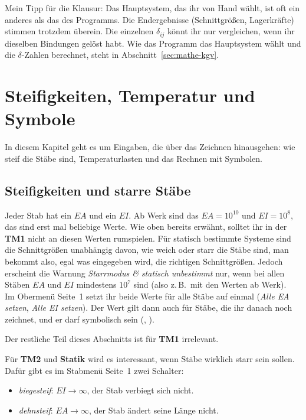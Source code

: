 Mein Tipp für die Klausur: Das Hauptsystem, das ihr von Hand wählt, ist oft ein anderes als das
des Programms. Die Endergebnisse (Schnittgrößen, Lagerkräfte) stimmen trotzdem überein. Die
einzelnen $\delta_{ij}$ könnt ihr nur vergleichen, wenn ihr dieselben Bindungen gelöst habt. Wie
das Programm das Hauptsystem wählt und die $\delta$-Zahlen berechnet, steht in
Abschnitt~\ref{sec:mathe-kgv}.

\section{Steifigkeiten, Temperatur und Symbole}

In diesem Kapitel geht es um Eingaben, die über das Zeichnen hinausgehen: wie steif die Stäbe
sind, Temperaturlasten und das Rechnen mit Symbolen.

\subsection{Steifigkeiten und starre Stäbe}\label{sec:starr}

Jeder Stab hat ein $EA$ und ein $EI$. Ab Werk sind das $EA = 10^{10}$ und $EI = 10^{8}$, das sind erst mal beliebige Werte.
Wie oben bereits erwähnt, solltet ihr in der \textbf{TM1} nicht an diesen Werten rumspielen. Für statisch bestimmte Systeme sind die Schnittgrößen
unabhängig davon, wie weich oder starr die Stäbe sind, man bekommt also, egal was eingegeben wird, die richtigen Schnittgrößen. Jedoch erscheint die Warnung \emph{Starrmodus \&
statisch unbestimmt} nur, wenn bei allen Stäben $EA$ und $EI$ mindestens $10^7$ sind (also z.\,B.\ mit den Werten ab Werk).\\
Im Obermenü Seite~1 setzt ihr beide Werte für alle Stäbe auf einmal (\emph{Alle EA setzen}, \emph{Alle EI setzen}). Der Wert gilt dann auch für Stäbe, die
ihr danach noch zeichnet, und er darf symbolisch sein (, ).

Der restliche Teil dieses Abschnitts ist für \textbf{TM1} irrelevant.

Für \textbf{TM2} und \textbf{Statik} wird es interessant, wenn Stäbe wirklich starr sein sollen.
Dafür gibt es im Stabmenü Seite~1 zwei Schalter:

\begin{itemize}
  \item \emph{biegesteif}: $EI \to \infty$, der Stab verbiegt sich nicht.
  \item \emph{dehnsteif}: $EA \to \infty$, der Stab ändert seine Länge nicht.
\end{itemize}

